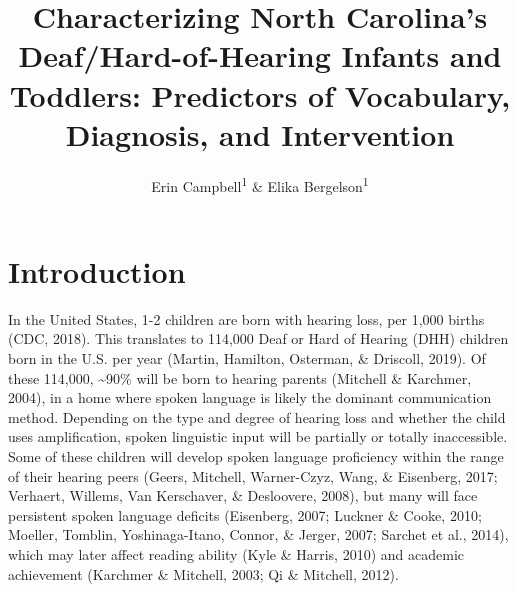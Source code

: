 \documentclass[english,man]{apa6}
\title{Characterizing North Carolina's Deaf/Hard-of-Hearing Infants and Toddlers: Predictors of Vocabulary, Diagnosis, and Intervention}
\author{Erin Campbell\textsuperscript{1} \& Elika Bergelson\textsuperscript{1}}
\date{}
\affiliation{\vspace{0.5cm}\textsuperscript{1} Duke University}
\begin{document}
\maketitle

\hypertarget{introduction}{%
\section{Introduction}\label{introduction}}

In the United States, 1-2 children are born with hearing loss, per 1,000 births (CDC, 2018). This translates to 114,000 Deaf or Hard of Hearing (DHH) children born in the U.S. per year (Martin, Hamilton, Osterman, \& Driscoll, 2019). Of these 114,000, \textasciitilde{}90\% will be born to hearing parents (Mitchell \& Karchmer, 2004), in a home where spoken language is likely the dominant communication method. Depending on the type and degree of hearing loss and whether the child uses amplification, spoken linguistic input will be partially or totally inaccessible. Some of these children will develop spoken language proficiency within the range of their hearing peers (Geers, Mitchell, Warner-Czyz, Wang, \& Eisenberg, 2017; Verhaert, Willems, Van Kerschaver, \& Desloovere, 2008), but many will face persistent spoken language deficits (Eisenberg, 2007; Luckner \& Cooke, 2010; Moeller, Tomblin, Yoshinaga-Itano, Connor, \& Jerger, 2007; Sarchet et al., 2014), which may later affect reading ability (Kyle \& Harris, 2010) and academic achievement (Karchmer \& Mitchell, 2003; Qi \& Mitchell, 2012).
\end{document}

